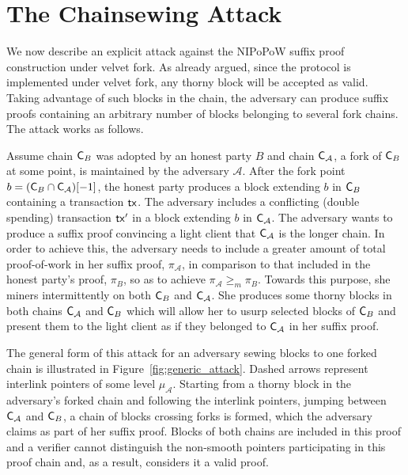 \section{The Chainsewing Attack}
We now describe an explicit attack against the NIPoPoW suffix proof construction under velvet fork. As already argued, since the protocol is implemented under velvet fork, any thorny block will be accepted as valid. Taking advantage of such blocks in the chain, the adversary can produce suffix proofs containing an arbitrary number of blocks belonging to several fork chains. The attack works as follows.

Assume chain $\mathsf{C}_B$ was adopted by an honest party $B$ and chain $\mathsf{C}_\mathcal{A}$, a fork of $\mathsf{C}_B$ at some point, is maintained by the adversary $\mathcal{A}$. After the fork point $b = (\mathsf{C}_B \cap \mathsf{C}_\mathcal{A})[-1]$, the honest party produces a block extending $b$ in $\mathsf{C}_B$ containing a transaction $\mathsf{tx}$. The adversary includes a conflicting (double spending) transaction $\mathsf{tx}'$ in a block extending $b$ in $\mathsf{C}_\mathcal{A}$.
The adversary wants to produce a suffix proof convincing a light client that $\mathsf{C}_\mathcal{A}$ is the longer chain. In order to achieve this, the adversary needs to include a greater amount of total proof-of-work in her suffix proof, $\pi_\mathcal{A}$, in comparison to that included in the honest party's proof, $\pi_B$, so as to achieve $\pi_\mathcal{A} \geq_m \pi_B$. Towards this purpose, she miners intermittently on both $\mathsf{C}_B$ and $\mathsf{C}_\mathcal{A}$. She produces some thorny blocks in both chains $\mathsf{C}_\mathcal{A}$ and $\mathsf{C}_B$ which will allow her to usurp selected blocks of $\mathsf{C}_B$ and present them to the light client as if they belonged to $\mathsf{C}_\mathcal{A}$ in her suffix proof.

The general form of this attack for an adversary sewing blocks to one forked chain is illustrated in Figure~\ref{fig:generic_attack}. Dashed arrows represent interlink pointers of some level $\mu_\mathcal{A}$. Starting from a thorny block in the adversary's forked chain and following the interlink pointers, jumping between $\mathsf{C}_\mathcal{A}$ and $\mathsf{C}_B$, a chain of blocks crossing forks is formed, which the adversary claims as part of her suffix proof. Blocks of both chains are included in this proof and a verifier cannot distinguish the non-smooth pointers participating in this proof chain and, as a result, considers it a valid proof.

